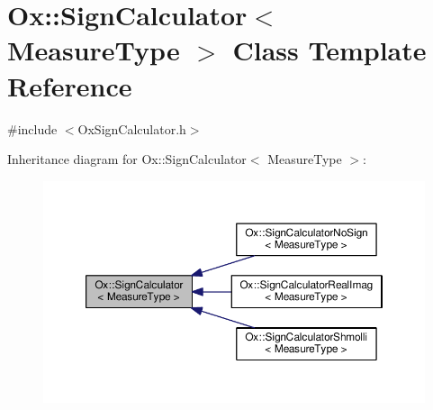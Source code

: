 \hypertarget{class_ox_1_1_sign_calculator}{\section{Ox\-:\-:Sign\-Calculator$<$ Measure\-Type $>$ Class Template Reference}
\label{class_ox_1_1_sign_calculator}
}


{\ttfamily \#include $<$Ox\-Sign\-Calculator.\-h$>$}



Inheritance diagram for Ox\-:\-:Sign\-Calculator$<$ Measure\-Type $>$\-:
\nopagebreak
\begin{figure}[H]
\begin{center}
\leavevmode
\includegraphics[width=350pt]{class_ox_1_1_sign_calculator__inherit__graph}
\end{center}
\end{figure}
